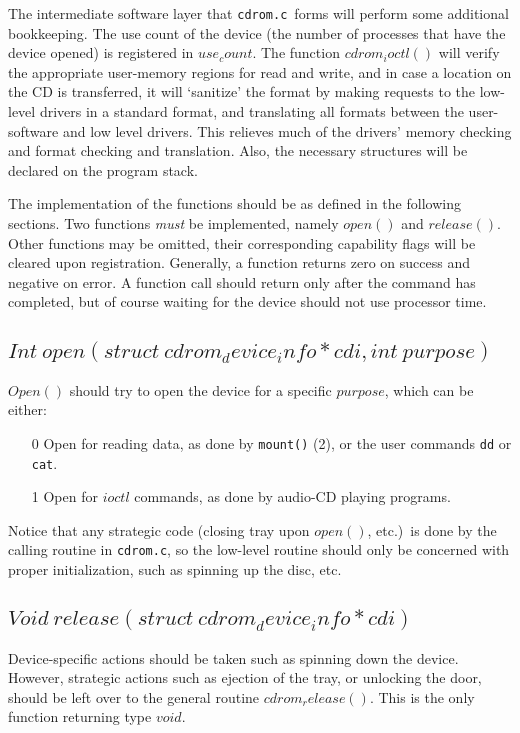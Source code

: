 \documentclass{article}
\def\cdromc{{\tt {cdrom.c}}}
\begin{document}
The intermediate software layer that \cdromc\ forms will perform some
additional bookkeeping. The use count of the device (the number of
processes that have the device opened) is registered in $use_count$. The
function $cdrom_ioctl()$ will verify the appropriate user-memory regions
for read and write, and in case a location on the CD is transferred,
it will `sanitize' the format by making requests to the low-level
drivers in a standard format, and translating all formats between the
user-software and low level drivers. This relieves much of the drivers'
memory checking and format checking and translation. Also, the necessary
structures will be declared on the program stack.

The implementation of the functions should be as defined in the
following sections. Two functions {\em must\/} be implemented, namely
$open()$ and $release()$. Other functions may be omitted, their
corresponding capability flags will be cleared upon registration.
Generally, a function returns zero on success and negative on error. A
function call should return only after the command has completed, but of
course waiting for the device should not use processor time.

\subsection{$Int\ open(struct\ cdrom_device_info * cdi, int\ purpose)$}

$Open()$ should try to open the device for a specific $purpose$, which
can be either:
\begin{itemize}
\item[0] Open for reading data, as done by {\tt {mount()}} (2), or the
user commands {\tt {dd}} or {\tt {cat}}.  
\item[1] Open for $ioctl$ commands, as done by audio-CD playing
programs.
\end{itemize}
Notice that any strategic code (closing tray upon $open()$, etc.)\ is
done by the calling routine in \cdromc, so the low-level routine
should only be concerned with proper initialization, such as spinning
up the disc, etc. %


\subsection{$Void\ release(struct\ cdrom_device_info * cdi)$}


Device-specific actions should be taken such as spinning down the device.
However, strategic actions such as ejection of the tray, or unlocking
the door, should be left over to the general routine $cdrom_release()$.
This is the only function returning type $void$.
\end{document}
